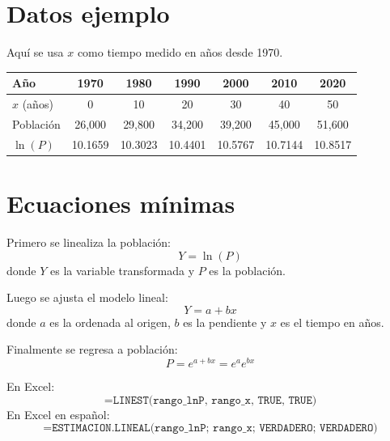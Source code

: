 \documentclass[12pt]{article}
\begin{document}

\section{Datos ejemplo}
Aquí se usa $x$ como tiempo medido en años desde 1970.

\begin{center}
\begin{tabular}{lcccccc}
\toprule
Año & 1970 & 1980 & 1990 & 2000 & 2010 & 2020 \\
\midrule
$x$ (años) & 0 & 10 & 20 & 30 & 40 & 50 \\
Población & 26,000 & 29,800 & 34,200 & 39,200 & 45,000 & 51,600 \\
$\ln(P)$ & 10.1659 & 10.3023 & 10.4401 & 10.5767 & 10.7144 & 10.8517 \\
\bottomrule
\end{tabular}
\end{center}

\section{Ecuaciones mínimas}
Primero se linealiza la población:
\begin{equation}
Y=\ln(P)
\end{equation}
donde $Y$ es la variable transformada y $P$ es la población.

Luego se ajusta el modelo lineal:
\begin{equation}
Y=a+bx
\end{equation}
donde $a$ es la ordenada al origen, $b$ es la pendiente y $x$ es el tiempo en años.

Finalmente se regresa a población:
\begin{equation}
P=e^{a+bx}=e^ae^{bx}
\end{equation}

En Excel:
\[
\texttt{=LINEST(rango\_lnP, rango\_x, TRUE, TRUE)}
\]
En Excel en español:
\[
\texttt{=ESTIMACION.LINEAL(rango\_lnP; rango\_x; VERDADERO; VERDADERO)}
\]

\end{document}
